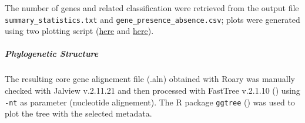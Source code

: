 The number of genes and related classification were retrieved from the output file
\texttt{summary\_statistics.txt} and \texttt{gene\_presence\_absence.csv}; plots were generated using two
plotting script (\href{https://github.com/sanger-pathogens/Roary/blob/master/bin/create_pan_genome_plots.R}{here}
and \href{https://github.com/sanger-pathogens/Roary/blob/master/contrib/roary_plots/roary_plots.py}{here}).


\subparagraph*{Phylogenetic Structure}

The resulting core gene alignement file (.aln) obtained with Roary was manually checked with
Jalview v.2.11.21 and then processed with FastTree v.2.1.10 (\cite{fasttree})
using \texttt{-nt} as parameter (nucleotide alignement). The R package \texttt{ggtree} (\cite{ggtree1, ggtree2, ggtree3}) was used to plot
the tree with the selected metadata.






